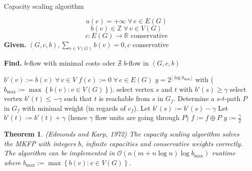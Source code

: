 \documentclass{article}
\newtheorem{theorem}{Theorem}
\newcommand{\set}[1]{\left\{#1\right\}}
\newcommand{\given}[1]{\textbf{Given.} #1\par}
\newcommand{\find}[1]{\textbf{Find.} #1\par}
\newcommand{\gath}[2]{$#1$-$#2$-path} %
\newcommand{\fall}{\;\forall\,}
\begin{document}
\begin{algorithm}
  \caption{Capacity scaling algorithm}
  \label{min-cut-algo}
  \[ u(e) = +\infty \fall e \in E(G) \]
  \[ b(v) \in \mathbb{Z} \fall v \in V(G) \]
  \[ c: E(G) \rightarrow \mathbb{R} \text{ conservative} \]
  \given{$(G, c, b), \sum_{v \in V(G)} b(v) = 0, c$ conservative}
  \find{$b$-flow with minimal costs oder $\nexists$ $b$-flow in $(G, c, b)$}
\begin{algorithmic}[1]
  \State $b'(v) := b(v) \fall v \in V$
  \State $f(e) := 0 \fall e \in E(G)$
    \State $y = 2^{\lfloor \log{b_{\text{max}}} \rfloor}$
      with ($b_{\text{max}} := \max\set{b(v) : v \in V(G)}$).
  \Else
     \State {}
  \EndIf
    \State {}
  \Else
    \State select vertex $s$ and $t$ with $b'(s) \geq \gamma$
    \State select vertex $b'(t) \leq -\gamma$ such that $t$ is reachable from $s$ in $G_f$.
      \State {}
    \EndIf
  \EndIf
  \State Determine a \gath st $P$ in $G_f$ with minimal weight (in regards of $c_f$).
  \State Let $b'(s) := b'(s) - \gamma$
  \State Let $b'(t) := b'(t) + \gamma$ (hence $\gamma$ flow units are going through $P$)
  \State $f := f \oplus P$
  \State {}
  \Else{}
    \State $y := \frac{\gamma}{2}$
    \State {}
  \EndIf
\end{algorithmic}
\end{algorithm}

\begin{theorem}\label{satz-5.11}
  (Edmonds and Karp, 1972)
  The capacity scaling algorithm solves the MKFP with integers $b$, infinite capacities and conservative weights correctly. The algorithm can be implemented in $\mathcal{O}(n (m + n \log{n}) \log{b_{\text{max}}})$ runtime where $b_{\text{max}} := \max\set{b(v): v \in V(G)}$.
\end{theorem}
\end{document}
